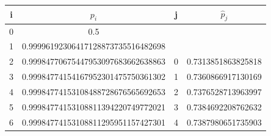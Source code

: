 \documentclass[12pt]{article}
\begin{document}
\begin{enumerate}
\begin{enumerate}
        \begin{center}
            \begin{tabular}{|c|c||c|c|}
                \hline
                i & $p_i$ & j & $\hat{p}_j$\\
                \hline
                0 & 0.5 & &\\
                1 & 0.99996192306417128873735516482698 & &\\
                2 & 0.99984770675447953097683662638863 & 0 & 0.7313851863825818\\
                3 & 0.99984774154167952301475750361302 & 1 & 0.7360866917130169\\
                4 & 0.99984774153108488728676565692653 & 2 & 0.7376528713963997\\
                5 & 0.99984774153108811394220749772021 & 3 & 0.7384692208762632\\
                6 & 0.99984774153108811295951157427301 & 4 & 0.7387980651735903\\
                \hline
            \end{tabular}
        \end{center}
    \end{enumerate}
\end{enumerate}
\end{document}
